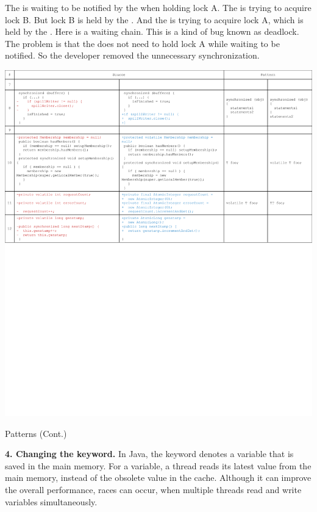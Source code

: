 The  is waiting to be notified by the  when holding lock A. The  is trying to acquire lock B. But lock B is held by the . And the  is trying to acquire lock A, which is held by the . Here is a waiting chain. This is a kind of bug known as deadlock. The problem is that the  does not need to hold lock A while waiting to be notified. So the developer removed the unnecessary synchronization.


\begin{table}
	\centering
	\includegraphics[width=1\textwidth]{patterns2}
	\caption{Patterns (Cont.)}
	\label{table:patterns2}
\end{table}

\noindent
\textbf{4. Changing the  keyword.} In Java, the  keyword denotes a variable that is saved in the main memory. For a  variable, a thread reads its latest value from the main memory, instead of the obsolete  value in the cache. Although it can improve the overall performance, races can occur, when multiple threads read and write  variables simultaneously.

